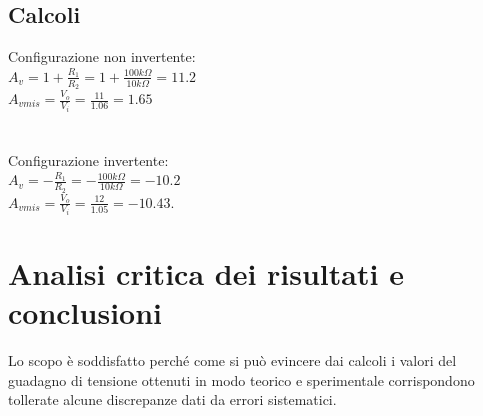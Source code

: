 \documentclass[12pt]{article}
\begin{document}
\subsection{Calcoli}
Configurazione non invertente:\\
$A_v=1+\frac{R_1}{R_2}=1+\frac{100k\Omega}{10k\Omega}=11.2$\\
$A_{vmis}=\frac{V_o}{V_i}=\frac{11}{1.06}=1.65$\\
\\
\\
Configurazione invertente:\\
$A_v=-\frac{R_1}{R_2}=-\frac{100k\Omega}{10k\Omega}=-10.2$\\
$A_{vmis}=\frac{V_o}{V_i}=\frac{12}{1.05}=-10.43.$\\

\section{Analisi critica dei risultati e conclusioni}
Lo scopo è soddisfatto perché come si può evincere dai calcoli i valori del guadagno di tensione 
ottenuti in modo teorico e sperimentale corrispondono tollerate alcune discrepanze dati da errori
sistematici.\\
\end{document}
